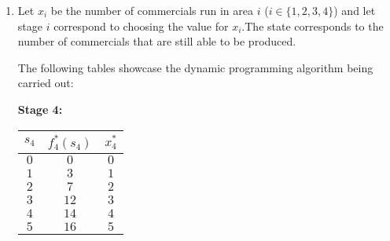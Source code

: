 \documentclass{article}[12pt,a4paper]
\begin{document}
\begin{enumerate}
  (b) The purchasing of the (rather expensive) coffee changes $W$ to $11$.
  We need only look at the new row of values formed for stage 1.
   \begin{center}
  \begin{tabular}{c | c c c | c | c}
  $s_1$ & $x_1 = 0$ & $x_1 = 1$ & $x_1 = 2$ & $f_1^*(s_1)$ & $x_1^*$ \\
  \hline
  $11$ & $0 + 19$ & $12 + 7$ & $-$ & $19$ & $0,1$
  \end{tabular}
  \end{center}
  
  The problem now has two optimum solutions $x_1 = 0, x_2 = 2, x_3 = 1$ and $x_1 = 1, x_2 = 1, x_3 = 0$
  which give us optimal objective value $19$. However, in the second case there will be \$$1$ leftover. Since
  this is a real-world problem, you may prefer the option of buying $1$ frozen pizza and $1$ bag of popcorn so
  that you have $1$ extra dollar that could go towards buying coffee.
  
  \pagebreak
  \item Let $x_i$ be the number of commercials run in area $i$ ($i \in \{ 1,2,3,4\}$) and let 
   stage $i$ correspond to choosing the value for $x_i$.The state corresponds to the number
   of commercials that are still able to be produced.
   
   The following tables showcase the dynamic programming algorithm being carried out:
   
   \textbf{Stage 4:}
   \begin{center}
   \begin{tabular}{c | c | c}
   $s_4$ & $f^*_4(s_4)$ & $x^*_4$ \\
   \hline
   $0$ & $0$ & $0$ \\
   $1$ & $3$ & $1$ \\
   $2$ & $7$ & $2$ \\
   $3$ & $12$ & $3$ \\
   $4$ & $14$ & $4$ \\
   $5$ & $16$ & $5$ \\
   \end{tabular}
   \end{center}
   

\end{enumerate}
\end{document}
